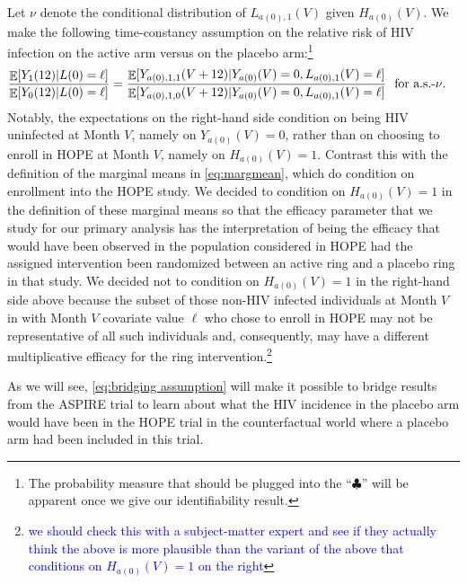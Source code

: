 \documentclass[12pt]{article}
\theoremstyle{definition}
\DeclareMathOperator{\cE}{\mathbb{E}}
\newcommand{\Hopen}{V}
\begin{document}
Let $\nu$ denote the conditional distribution of $L_{a(0),1}(V)$ given $ H_{a(0)}(V)$. We make the following time-constancy assumption on the relative risk of HIV infection on the active arm versus on the placebo arm:\footnote{\color{blue}The probability measure that should be plugged into the ``$\clubsuit$'' will be apparent once we give our identifiability result.}
\begin{align}
    \frac{\cE[Y_{1}(12)|L(0)=\ell]}{\cE[Y_{0}(12)|L(0)=\ell]}&= \frac{\cE[Y_{a(0),1,1}(\Hopen+12)|Y_{a(0)}(\Hopen)=0,L_{a(0),1}(\Hopen)=\ell]}{\cE[Y_{a(0),1,0}(\Hopen+12)|Y_{a(0)}(\Hopen)=0,L_{a(0),1}(\Hopen)=\ell]}\ \textnormal{ for a.s.-$\nu$}. \label{eq:bridging assumption}
\end{align}
Notably, the expectations on the right-hand side condition on being HIV uninfected at Month $\Hopen$, namely on $Y_{a(0)}(\Hopen)=0$, rather than on choosing to enroll in HOPE at Month $\Hopen$, namely on $H_{a(0)}(\Hopen)=1$. Contrast this with the definition of the marginal means in \eqref{eq:margmean}, which do condition on enrollment into the HOPE study. We decided to condition on $H_{a(0)}(\Hopen)=1$ in the definition of these marginal means so that the efficacy parameter that we study for our primary analysis has the interpretation of being the efficacy that would have been observed in the population considered in HOPE had the assigned intervention been randomized between an active ring and a placebo ring in that study. We decided not to condition on $H_{a(0)}(\Hopen)=1$ in the right-hand side above because the subset of those non-HIV infected individuals at Month $\Hopen$ in with Month $\Hopen$ covariate value $\ell$ who chose to enroll in HOPE may not be representative of all such individuals and, consequently, may have a different multiplicative efficacy for the ring intervention.\footnote{\textcolor{blue}{we should check this with a subject-matter expert and see if they actually think the above is more plausible than the variant of the above that conditions on $H_{a(0)}(\Hopen)=1$ on the right}}

As we will see, \eqref{eq:bridging assumption} will make it possible to bridge results from the ASPIRE trial to learn about what the HIV incidence in the placebo arm would have been in the HOPE trial in the counterfactual world where a placebo arm had been included in this trial.
\end{document}

